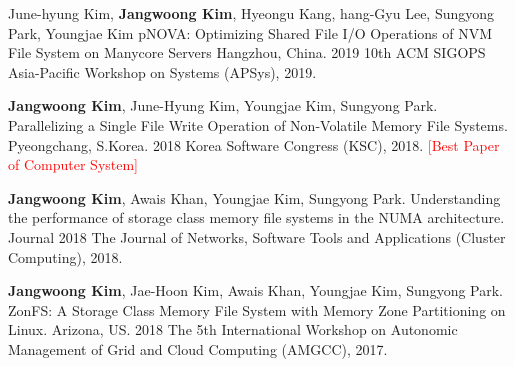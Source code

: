 

\begin{cventries}


  \cventry
    {June-hyung Kim, \textbf{Jangwoong Kim}, Hyeongu Kang, hang-Gyu Lee, Sungyong Park, Youngjae Kim} %
    {pNOVA: Optimizing Shared File I/O Operations of NVM File System on Manycore Servers} %
    {Hangzhou, China.} %
    {2019} %
    {
      10th ACM SIGOPS Asia-Pacific Workshop on Systems (APSys), 2019.
    }

  \cventry
	{\textbf{Jangwoong Kim}, June-Hyung Kim, Youngjae Kim,  Sungyong Park.}
	{Parallelizing a Single File Write Operation of Non-Volatile Memory File Systems.}
	{Pyeongchang, S.Korea.}
	{2018}
	{
		Korea Software Congress (KSC), 2018. \textcolor{red}{[Best Paper of Computer System]}
	}

  \cventry
	{\textbf{Jangwoong Kim},  Awais Khan,  Youngjae Kim,  Sungyong Park.}
	{Understanding the performance of storage class memory file systems in the NUMA architecture.}
	{Journal}
	{2018}
	{
		The Journal of Networks, Software Tools and Applications (Cluster Computing), 2018.
	}

  \cventry
	{\textbf{Jangwoong Kim}, Jae-Hoon Kim,  Awais Khan,  Youngjae Kim,  Sungyong Park.}
	{ZonFS: A Storage Class Memory File System with Memory Zone Partitioning on Linux.}
	{Arizona, US.}
	{2018}
	{
		The 5th International Workshop on Autonomic Management of Grid and Cloud Computing (AMGCC), 2017.
	}


\end{cventries}
